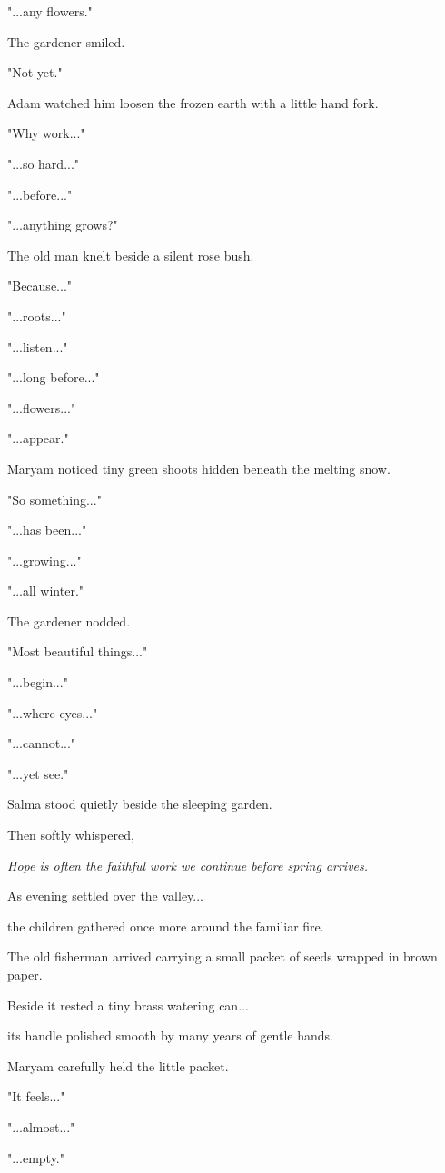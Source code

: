 \documentclass[12pt,openany]{book}
\begin{document}
"...any flowers."

The gardener smiled.

"Not yet."

Adam watched him loosen the frozen earth with a little hand fork.

"Why work..."

"...so hard..."

"...before..."

"...anything grows?"

The old man knelt beside a silent rose bush.

"Because..."

"...roots..."

"...listen..."

"...long before..."

"...flowers..."

"...appear."

Maryam noticed tiny green shoots hidden beneath the melting snow.

"So something..."

"...has been..."

"...growing..."

"...all winter."

The gardener nodded.

"Most beautiful things..."

"...begin..."

"...where eyes..."

"...cannot..."

"...yet see."

Salma stood quietly beside the sleeping garden.

Then softly whispered,

\emph{Hope is often the faithful work we continue before spring arrives.}

As evening settled over the valley...

the children gathered once more around the familiar fire.

The old fisherman arrived carrying a small packet of seeds wrapped in brown paper.

Beside it rested a tiny brass watering can...

its handle polished smooth by many years of gentle hands.

Maryam carefully held the little packet.

"It feels..."

"...almost..."

"...empty."
\end{document}
